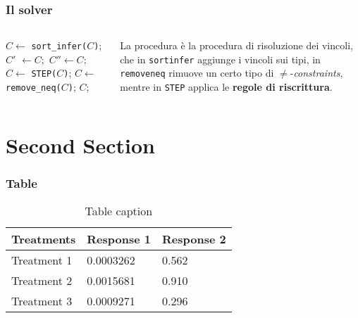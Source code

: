 \documentclass{beamer}
\begin{document}
\begin{frame}
  \frametitle{Il solver \satset{}}
  \begin{columns}[c]

    \begin{algorithmic}[1]
      \State $C \gets $ \texttt{sort\_infer($C$)};
      \Repeat
      \State $C'$ $\gets C;$
      \Repeat
      \State $C'' \gets C;$
      \State $C \gets $ \texttt{STEP($C$)};
      \State $C \gets $ \texttt{remove\_neq($C$)};
      \State
      \State\Return $C$;
      \EndProcedure
    \end{algorithmic}

    La procedura \satset{} è la procedura di risoluzione dei vincoli,
    che in \texttt{sort\textunderscore infer} aggiunge i vincoli sui
    tipi, in \texttt{remove\textunderscore neq} rimuove un certo tipo
    di $\neq$-\textit{constraints}, mentre in \texttt{STEP} applica le
    \textbf{regole di riscrittura}.
  \end{columns}
\end{frame}

\section{Second Section}

\begin{frame}
\frametitle{Table}
\begin{table}
\begin{tabular}{l l l}
\toprule
\textbf{Treatments} & \textbf{Response 1} & \textbf{Response 2}\\
\midrule
Treatment 1 & 0.0003262 & 0.562 \\
Treatment 2 & 0.0015681 & 0.910 \\
Treatment 3 & 0.0009271 & 0.296 \\
\bottomrule
\end{tabular}
\caption{Table caption}
\end{table}
\end{frame}
\end{document}
